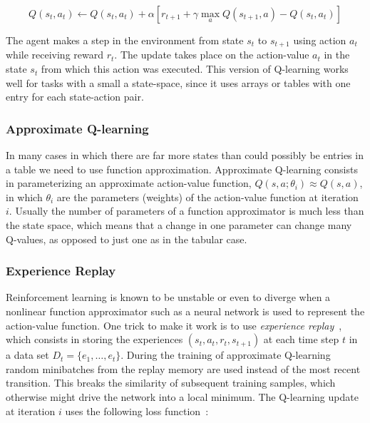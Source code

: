\documentclass[a4paper]{article}
\begin{document}
\begin{equation}
Q(s_t,a_t) \gets Q(s_t,a_t) + \alpha \left[r_{t+1} + \gamma \max_a Q(s_{t+1},a) - Q(s_t,a_t)\right]
\end{equation}

The agent makes a step in the environment from state $s_t$ to $s_{t+1}$ using action $a_t$ while receiving reward $r_t$. The update takes place on the action-value $a_t$ in the state $s_t$ from which this action was executed. This version of Q-learning works well for tasks with a small a state-space, since it uses arrays or tables with one entry for each state-action pair.

\subsubsection{Approximate Q-learning}

In many cases in which there are far more states than could possibly be entries in a table we need to use function approximation. Approximate Q-learning consists in parameterizing an approximate action-value function, $Q(s,a;\theta_i) \approx Q(s,a)$, in which $\theta_i$ are the parameters (weights) of the action-value function at iteration $i$. Usually the number of parameters of a function approximator is much less than the state space, which means that a change in one parameter can change many Q-values, as opposed to just one as in the tabular case.

\subsubsection{Experience Replay}

Reinforcement learning is known to be unstable or even to diverge when a nonlinear function approximator such as a neural network is used to represent the action-value function. One trick to make it work is to use \emph{experience replay}~, which consists in storing the experiences $(s_t, a_t, r_t, s_{t+1})$ at each time step $t$ in a data set $D_t=\{e_1,\dots,e_t\}$. During the training of approximate Q-learning random minibatches from the replay memory are used instead of the most recent transition. This breaks the similarity of subsequent training samples, which otherwise might drive the network into a local minimum. The \mbox{Q-learning} update at iteration $i$ uses the following loss function~\citep{Mnih2015AtariNature}:
\end{document}
